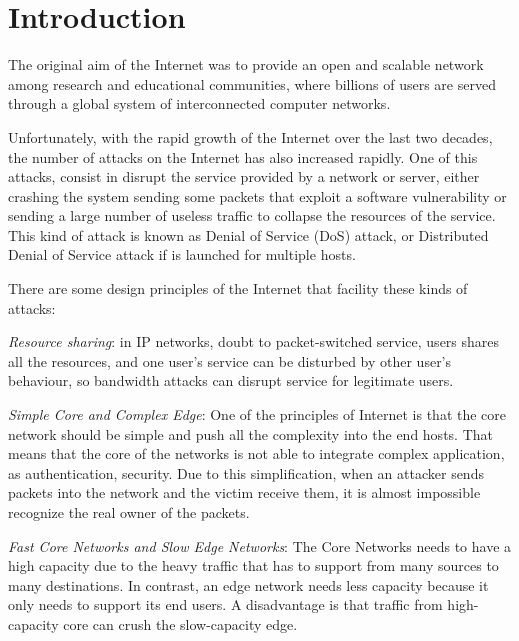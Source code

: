 
\chapter{Introduction}
\label{chapter:intro}

The original aim of the Internet was to provide an open and scalable network among research and educational communities, where billions of users are served through a global system of interconnected computer networks.

\par

Unfortunately, with the rapid growth of the Internet over the last two decades, the number of attacks on the Internet has also increased rapidly. One of this attacks, consist in disrupt the service provided by a network or server, either crashing the system sending some packets that exploit a software vulnerability or sending a large number of useless traffic to collapse the resources of the service. This kind of attack is known as Denial of Service (DoS) attack, or Distributed Denial of Service attack if is launched for multiple hosts.

\par

There are some design principles of the Internet that facility these kinds of attacks:

\par

\textit{Resource sharing}: in IP networks, doubt to packet-switched service, users shares all the resources, and one user's service can be disturbed by other user's behaviour, so bandwidth attacks can disrupt service for legitimate users.
\par
\textit{Simple Core and Complex Edge}: One of the principles of Internet is that the core network should be simple and push all the complexity into the end hosts. That means that the core of the networks is not able to integrate complex application, as authentication, security. Due to this simplification, when an attacker sends packets into the network and the victim receive them, it is almost impossible recognize the real owner of the packets.
\par
\textit{Fast Core Networks and Slow Edge Networks}: The Core Networks needs to have a high capacity due to the heavy traffic that has to support from many sources to many destinations. In contrast, an edge network needs less capacity because it only needs to support its end users. A disadvantage is that traffic from high-capacity core can crush the slow-capacity edge.

